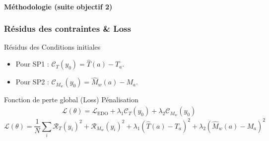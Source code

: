 \documentclass[handout]{beamer}
\newtheorem{pbm et hypo}[thm]{Problématique et hypothèses}
\begin{document}
	
	
	\begin{frame}
		\framesubtitle{\textbf{Méthodologie (suite objectif 2)}}
		\frametitle{\textbf{Résidus des contraintes \& Loss}}
		
		\begin{block}{Résidus des Conditions initiales}\pause
	
			\begin{itemize}
				\item Pour SP1 : $\mathcal{C}_T(y_0) = \hat{T}(a) - T_{a}$.
				\item Pour SP2 : $\mathcal{C}_{M_w} (y_0) = \hat{M}_w(a) - M_{a}$.
			\end{itemize}\pause
		\end{block}
		\vspace{0.5cm}
		\begin{block}{Fonction de perte global (Loss) \texttwelveudash\text{ }  Pénalisation} \pause 
			\begin{align}
			\mathcal{L}( \theta ) = \mathcal{L}_{\text{EDO}} + \lambda_1 \mathcal{C}_T(y_0) + \lambda_2 \mathcal{C}_{M_w} (y_0)
		\end{align}
		\small\[
		\mathcal{L}(\theta) = {\frac{1}{N}\sum_i \mathcal{R}_T(y_i)^2 + \mathcal{R}_{M_w}(y_i)^2}+ \lambda_1 {(\hat{T}(a)-T_a)^2 + \lambda_2 (\hat{M}_w(a)-M_a)^2}
		\]
		\end{block}
	\end{frame}
	
	
	
\end{document}
